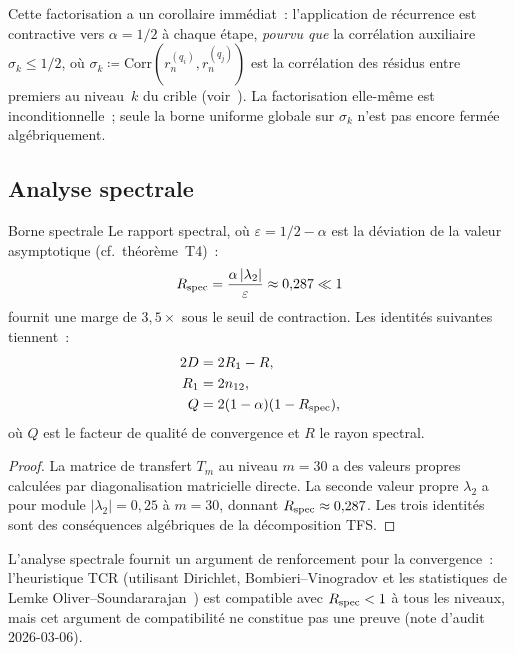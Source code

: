 \documentclass[12pt,a4paper]{article}
\begin{document}
Cette factorisation a un corollaire immédiat~: l'application de
récurrence est contractive vers $\alpha = 1/2$ à chaque étape,
\emph{pourvu que} la corrélation auxiliaire $\sigma_k \leq 1/2$, où
$\sigma_k \coloneqq \mathrm{Corr}(r_n^{(q_i)}, r_n^{(q_j)})$ est la
corrélation des résidus entre premiers au niveau~$k$ du crible
(voir~\cite{companion_M1}). La factorisation elle-même est
inconditionnelle~; seule la borne uniforme globale sur $\sigma_k$
n'est pas encore fermée algébriquement.

\subsection{Analyse spectrale}
\label{sec:ch7_spectral}

\begin{thmbox}{Borne spectrale}
\label{thm:spectral}
Le rapport spectral, où $\varepsilon = 1/2 - \alpha$ est la déviation
de la valeur asymptotique (cf.\ théorème~T4)~:
\begin{equation}
  R_{\rm spec} = \frac{\alpha\,|\lambda_2|}{\varepsilon}
  \approx 0{,}287 \ll 1
  \label{eq:R_spec}
\end{equation}
fournit une marge de $3{,}5\times$ sous le seuil de contraction.
Les identités suivantes tiennent~:
\begin{align}
  2D    &= 2R_1 - R, \label{eq:id1} \\
  R_1   &= 2n_{12}, \label{eq:id2} \\
  Q     &= 2(1-\alpha)(1 - R_{\rm spec}), \label{eq:id3}
\end{align}
où $Q$ est le facteur de qualité de convergence et $R$ le rayon
spectral.

\begin{proof}
La matrice de transfert $T_m$ au niveau $m = 30$ a des valeurs
propres calculées par diagonalisation matricielle directe. La seconde
valeur propre $\lambda_2$ a pour module $|\lambda_2| = 0{,}25$
à $m = 30$, donnant $R_{\rm spec} \approx 0{,}287$. Les trois
identités sont des conséquences algébriques de la décomposition TFS.
\end{proof}
\end{thmbox}

L'analyse spectrale fournit un argument de renforcement pour la
convergence~: l'heuristique TCR (utilisant Dirichlet,
Bombieri--Vinogradov et les statistiques de Lemke
Oliver--Soundararajan~\cite{LemkeOliverSoundararajan2016}) est
compatible avec $R_{\rm spec} < 1$ à tous les niveaux, mais cet
argument de compatibilité ne constitue pas une preuve (note d'audit
2026-03-06).
\end{document}
